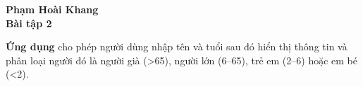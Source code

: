 \documentclass{article}
\begin{document}
\begin{center}
    \Large\textbf{Phạm Hoài Khang} \\[0.5cm]
    \textbf{Bài tập 2}
\end{center}

\noindent\textbf{Ứng dụng} cho phép người dùng nhập tên và tuổi sau đó hiển thị thông tin và phân loại người đó là người già (>65), người lớn (6–65), trẻ em (2–6) hoặc em bé (<2).
\end{document}
